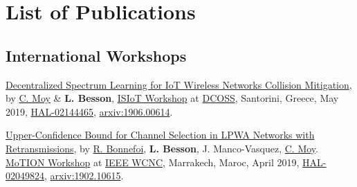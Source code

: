 \chapter*{List of Publications}




\section*{International Workshops}
\renewcommand{\labelenumi}{[IW-\arabic{enumi}]}
\begin{etaremune}
\item
  \href{https://hal.inria.fr/hal-02144465/document}{Decentralized Spectrum Learning for IoT Wireless Networks Collision Mitigation}, by \href{https://moychris.wordpress.com/}{C. Moy} \& \textbf{L. Besson},
  \href{https://sites.google.com/view/ISIoT2019/}{ISIoT Workshop} at \href{https://dcoss.org/}{DCOSS}, Santorini, Greece, May 2019,
  \href{https://hal.inria.fr/hal-02144465}{HAL-02144465},
  \href{https://arxiv.org/abs/1906.00614}{arxiv:1906.00614}.
  \cite{MoyBesson2019}
\item
  \href{https://perso.crans.org/besson/articles/BMBBM__IEEE_WCNC__2019.pdf}{Upper-Confidence
  Bound for Channel Selection in LPWA Networks with Retransmissions},
  by \href{https://remibonnefoi.wordpress.com/}{R. Bonnefoi}, \textbf{L. Besson}, J.
  Manco-Vasquez,
  \href{https://moychris.wordpress.com/}{C. Moy}.
  \href{https://sites.google.com/view/wcncworkshop-motion2019/}{MoTION Workshop} at
  \href{http://wcnc2019.ieee-wcnc.org/}{IEEE WCNC},
  Marrakech, Maroc, April 2019,
  \href{https://hal.inria.fr/hal-02049824}{HAL-02049824},
  \href{https://arxiv.org/abs/1902.10615}{arxiv:1902.10615}.
  \cite{Bonnefoi2019WCNC}
\end{etaremune}


